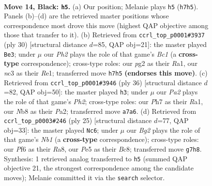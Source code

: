 \documentclass[11pt]{article}
\begin{document}
\clearpage

\begin{figure}[p]\centering
\begin{subfigure}{0.46\textwidth}\centering
\resizebox{\linewidth}{!}{%
\newchessgame
\chessboard[
  setfen={rn3r2/pppb1kbp/5pp1/4p3/2P1P3/2N1BN2/PP3PP1/1R1BK2R b K - 5 14},
  showmover=false,
  pgfstyle=straightmove, color=movearrow, markmove={h7-h5}
]}
\caption{}
\end{subfigure}\hfill
\begin{subfigure}{0.46\textwidth}\centering
\resizebox{\linewidth}{!}{%
\newchessgame
\chessboard[
  setfen={rb1r2k1/pb3ppp/1p2pn2/1Nn5/2P5/5NP1/PP3PBP/R1B1R1K1 w - - 0 16},
  showmover=false,
  pgfstyle=straightmove, color=movearrow, markmove={c1-e3}
]}
\caption{}
\end{subfigure}
\\[4pt]
\begin{subfigure}{0.46\textwidth}\centering
\resizebox{\linewidth}{!}{%
\newchessgame
\chessboard[
  setfen={r3k2r/pp2bp2/2p1p1n1/3pP3/3P1PBn/2P5/PP1N3P/R1B2RK1 w kq - 3 19},
  showmover=false,
  pgfstyle=straightmove, color=movearrow, markmove={h2-h3}
]}
\caption{}
\end{subfigure}\hfill
\begin{subfigure}{0.46\textwidth}\centering
\resizebox{\linewidth}{!}{%
\newchessgame
\chessboard[
  setfen={rnb2rk1/pp3pbp/4p1p1/8/3PP3/5N2/P2BBPPP/2R1K2R b K - 1 13},
  showmover=false,
  pgfstyle=straightmove, color=movearrow, markmove={b8-c6}
]}
\caption{}
\end{subfigure}
\caption{\textbf{Move 14, Black: \texttt{h5}.} (a) Our position; Melanie plays \texttt{h5} (\texttt{h7h5}). Panels (b)--(d) are the retrieved master positions whose correspondence most drove this move (highest QAP objective among those that transfer to it). (b) Retrieved from \texttt{ccrl\_top\_p0001\#3937} (ply 30) [structural distance $d$=85, QAP obj=21]: the master played \texttt{Be3}; under $\mu$ our \emph{Ph2} plays the role of that game's \emph{Bc1} (a \textbf{cross-type} correspondence); cross-type roles: our \emph{p}g2 as their \emph{R}a1, our \emph{n}c3 as their \emph{R}e1; transferred move \texttt{h7h5} \textbf{(endorses this move)}. (c) Retrieved from \texttt{ccrl\_top\_p0001\#3946} (ply 36) [structural distance $d$=82, QAP obj=50]: the master played \texttt{h3}; under $\mu$ our \emph{Pa2} plays the role of that game's \emph{Ph2}; cross-type roles: our \emph{P}h7 as their \emph{R}a1, our \emph{N}b8 as their \emph{P}a2; transferred move \texttt{a7a6}. (d) Retrieved from \texttt{ccrl\_top\_p0003\#246} (ply 25) [structural distance $d$=77, QAP obj=33]: the master played \texttt{Nc6}; under $\mu$ our \emph{Bg2} plays the role of that game's \emph{Nb1} (a \textbf{cross-type} correspondence); cross-type roles: our \emph{P}f6 as their \emph{R}a8, our \emph{P}e5 as their \emph{B}c8; transferred move \texttt{g7h8}. Synthesis: 1 retrieved analog transferred to \texttt{h5} (summed QAP objective 21, the strongest correspondence among the candidate moves); Melanie committed it via the \texttt{search} selector.}
\label{fig:thought-m27}
\end{figure}
\end{document}
